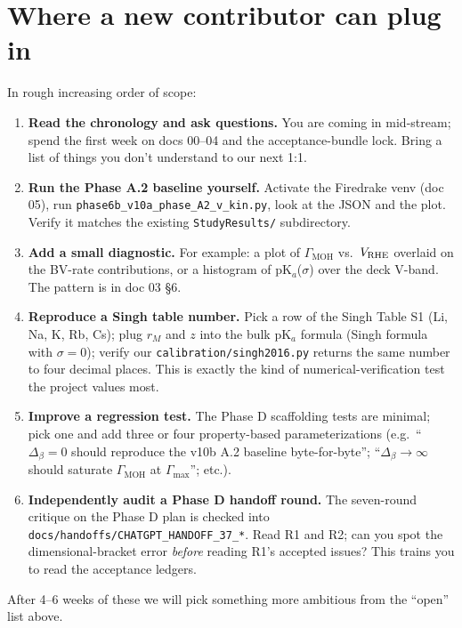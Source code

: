 \documentclass[11pt]{article}
\begin{document}
\section{Where a new contributor can plug in}

In rough increasing order of scope:

\begin{enumerate}[leftmargin=*]
\item \textbf{Read the chronology and ask questions.} You are coming
      in mid-stream; spend the first week on docs 00--04 and the
      acceptance-bundle lock. Bring a list of things you don't
      understand to our next 1:1.

\item \textbf{Run the Phase A.2 baseline yourself.} Activate the
      Firedrake venv (doc 05), run
      \texttt{phase6b\_v10a\_phase\_A2\_v\_kin.py}, look at the JSON
      and the plot. Verify it matches the existing
      \texttt{StudyResults/} subdirectory.

\item \textbf{Add a small diagnostic.} For example: a plot of
      $\Gamma_{\mathrm{MOH}}$ vs.\ $V_{\mathrm{RHE}}$ overlaid on the BV-rate
      contributions, or a histogram of pK$_a$($\sigma$) over the
      deck V-band. The pattern is in doc 03 \S 6.

\item \textbf{Reproduce a Singh table number.} Pick a row of the
      Singh Table S1 (Li, Na, K, Rb, Cs); plug $r_M$ and $z$ into
      the bulk pK$_a$ formula (Singh formula with $\sigma=0$);
      verify our \texttt{calibration/singh2016.py} returns the same
      number to four decimal places. This is exactly the kind of
      numerical-verification test the project values most.

\item \textbf{Improve a regression test.} The Phase D scaffolding
      tests are minimal; pick one and add three or four
      property-based parameterizations (e.g.\
      ``$\Delta_\beta = 0$ should reproduce the v10b A.2 baseline
      byte-for-byte''; ``$\Delta_\beta \to \infty$ should saturate
      $\Gamma_{\mathrm{MOH}}$ at $\Gamma_{\max}$''; etc.).

\item \textbf{Independently audit a Phase D handoff round.} The
      seven-round critique on the Phase D plan is checked into
      \texttt{docs/handoffs/CHATGPT\_HANDOFF\_37\_*}. Read R1 and
      R2; can you spot the dimensional-bracket error \emph{before}
      reading R1's accepted issues? This trains you to read the
      acceptance ledgers.
\end{enumerate}

After 4--6 weeks of these we will pick something more ambitious from
the ``open'' list above.

\onboardingfooter
\end{document}
